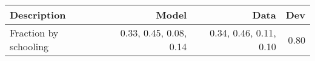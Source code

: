 \begin{tabular}{lrrr}
\hline
Description & Model  & Data  & Dev  \\ 
\hline
Fraction by schooling & 0.33, 0.45, 0.08, 0.14  & 0.34, 0.46, 0.11, 0.10  & 0.80  \\ 
\hline
\end{tabular}%

